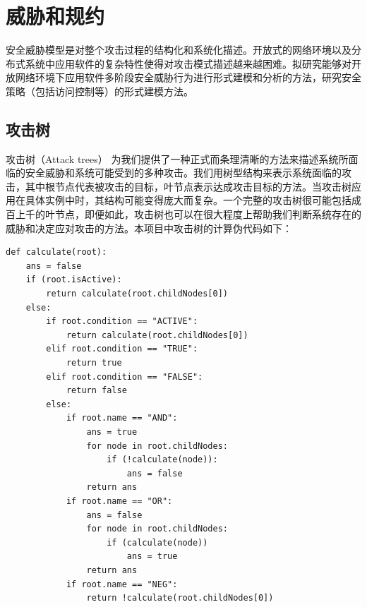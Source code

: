 \section{威胁和规约}
安全威胁模型是对整个攻击过程的结构化和系统化描述。开放式的网络环境以及分布式系统中应用软件的复杂特性使得对攻击模式描述越来越困难。拟研究能够对开放网络环境下应用软件多阶段安全威胁行为进行形式建模和分析的方法，研究安全策略（包括访问控制等）的形式建模方法。
\subsection{攻击树}
攻击树（Attack trees） 为我们提供了一种正式而条理清晰的方法来描述系统所面临的安全威胁和系统可能受到的多种攻击。我们用树型结构来表示系统面临的攻击，其中根节点代表被攻击的目标，叶节点表示达成攻击目标的方法。当攻击树应用在具体实例中时，其结构可能变得庞大而复杂。一个完整的攻击树很可能包括成百上千的叶节点，即便如此，攻击树也可以在很大程度上帮助我们判断系统存在的威胁和决定应对攻击的方法。本项目中攻击树的计算伪代码如下：
\lstset{
	caption=攻击树的计算, 
	basicstyle=\ttfamily\footnotesize,
	frame=tb,
	xleftmargin=.01\textwidth, xrightmargin=.01\textwidth
}
\begin{lstlisting}
def calculate(root):
	ans = false
	if (root.isActive):
		return calculate(root.childNodes[0])
	else:
		if root.condition == "ACTIVE":
			return calculate(root.childNodes[0])
		elif root.condition == "TRUE":
			return true
		elif root.condition == "FALSE":
			return false
		else:
			if root.name == "AND":
				ans = true
				for node in root.childNodes:
					if (!calculate(node)):
						ans = false
				return ans
			if root.name == "OR":
				ans = false
				for node in root.childNodes:
					if (calculate(node))
						ans = true
				return ans
			if root.name == "NEG":
				return !calculate(root.childNodes[0])

\end{lstlisting}
